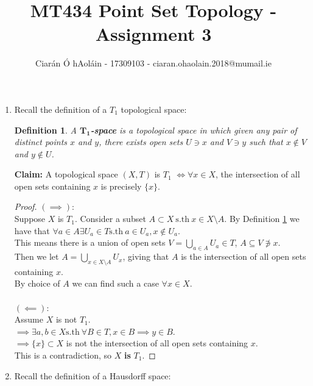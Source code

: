 \documentclass{article}
\title{MT434 Point Set Topology - Assignment 3}
\author{Ciarán Ó hAoláin - 17309103 - ciaran.ohaolain.2018@mumail.ie}
\newcommand{\sth}{\mathrm{s.th}\ }
\newtheorem{definition}[theorem]{Definition}
\theoremstyle{remark}
\begin{document}
\maketitle
\begin{enumerate}
    \item Recall the definition of a $T_1$ topological space:
          \begin{framed}
              \setcounter{section}{4}
              \begin{definition}
                  \label{deft1}
                  A $\mathbf{T_1}$\textbf{-space} is a topological space in which given any pair of distinct points $x$ and $y$, there exists open sets $U \ni x$ and $V \ni y$ such that $x \notin V$ and $y \notin U$.
              \end{definition}
          \end{framed}
          \textbf{Claim:} A topological space $(X, T )$ is $T_1$ $\iff \forall x \in X$, the intersection of all open sets containing $x$ is precisely $\{x\}$.
          \begin{proof}
              $(\implies)$:\\
              Suppose $X$ is $T_1$.
              Consider a subset $A \subset X\ \sth x \in X \setminus A$.
              By Definition \ref{deft1} we have that
              $\forall a \in A \exists U_a \in T  \sth a \in U_a, x \notin U_a$.\\
              This means there is a union of open sets
              $V = \bigcup_{a \in A} U_a \in T$, $A \subseteq V \not\ni x$.\\
              Then we let $A=\bigcup_{x \in X \setminus A}U_x$,
              giving that $A$ is the intersection of all open sets containing $x$.\\
              By choice of $A$ we can find such a case $\forall x \in X$.\\
              \\
              $(\impliedby)$:\\
              Assume  $X$ is not $T_1$.\\
              $\implies \exists a, b \in X \sth \forall B \in T, x \in B \implies y \in B$.\\
              $\implies \{x\}\subset X$ is not the intersection of all open sets containing $x$.\\
              This is a contradiction, so $X$ \textbf{is} $T_1$.
          \end{proof}
          \pagebreak
    \item Recall the definition of a Hausdorff space:

\end{enumerate}
\end{document}
